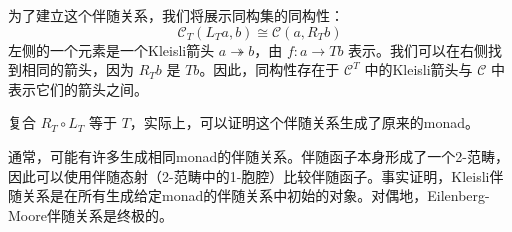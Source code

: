 \documentclass[DaoFP]{subfiles}
\begin{document}
    为了建立这个伴随关系，我们将展示同构集的同构性：
    \[\mathcal{C}_T(L_T a, b) \cong \mathcal{C}(a, R_T b)\]
    左侧的一个元素是一个Kleisli箭头 $a \twoheadrightarrow b$，由 $f \colon a \to T b$ 表示。我们可以在右侧找到相同的箭头，因为 $R_T b$ 是 $T b$。因此，同构性存在于 $\mathcal{C}^T$ 中的Kleisli箭头与 $\mathcal{C}$ 中表示它们的箭头之间。

    复合 $R_T \circ L_T$ 等于 $T$，实际上，可以证明这个伴随关系生成了原来的monad。

    通常，可能有许多生成相同monad的伴随关系。伴随函子本身形成了一个2-范畴，因此可以使用伴随态射（2-范畴中的1-胞腔）比较伴随函子。事实证明，Kleisli伴随关系是在所有生成给定monad的伴随关系中初始的对象。对偶地，Eilenberg-Moore伴随关系是终极的。
\end{document}
